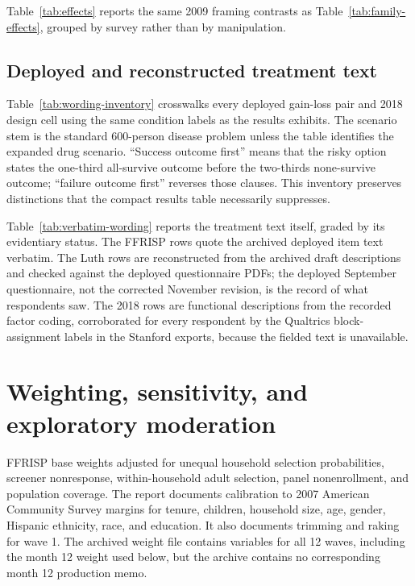\documentclass[11pt]{article}
\begin{document}
Table~\ref{tab:effects} reports the same 2009 framing contrasts as Table~\ref{tab:family-effects}, grouped by survey rather than by manipulation.



\subsection{Deployed and reconstructed treatment text}

Table~\ref{tab:wording-inventory} crosswalks every deployed gain-loss pair and 2018 design cell using the same condition labels as the results exhibits. The scenario stem is the standard 600-person disease problem unless the table identifies the expanded drug scenario. ``Success outcome first'' means that the risky option states the one-third all-survive outcome before the two-thirds none-survive outcome; ``failure outcome first'' reverses those clauses. This inventory preserves distinctions that the compact results table necessarily suppresses.

Table~\ref{tab:verbatim-wording} reports the treatment text itself, graded by its evidentiary status. The FFRISP rows quote the archived deployed item text verbatim. The Luth rows are reconstructed from the archived draft descriptions and checked against the deployed questionnaire PDFs; the deployed September questionnaire, not the corrected November revision, is the record of what respondents saw. The 2018 rows are functional descriptions from the recorded factor coding, corroborated for every respondent by the Qualtrics block-assignment labels in the Stanford exports, because the fielded text is unavailable.

\begin{landscape}
\begingroup
\setlength{\tabcolsep}{3.5pt}

\endgroup

\begingroup
\setlength{\tabcolsep}{3.5pt}

\endgroup
\end{landscape}

\clearpage
\section{Weighting, sensitivity, and exploratory moderation}

FFRISP base weights adjusted for unequal household selection probabilities, screener nonresponse, within-household adult selection, panel nonenrollment, and population coverage. The report documents calibration to 2007 American Community Survey margins for tenure, children, household size, age, gender, Hispanic ethnicity, race, and education. It also documents trimming and raking for wave 1. The archived weight file contains variables for all 12 waves, including the month 12 weight used below, but the archive contains no corresponding month 12 production memo.
\end{document}
